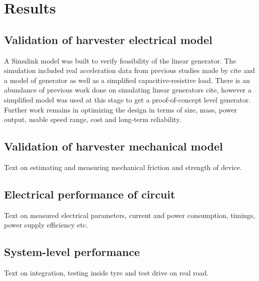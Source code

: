 \section{Results}

\subsection{Validation of harvester electrical model}
A Simulink model was built to verify feasibility of the linear generator. The simulation included real acceleration data from previous studies made by {\color{red} cite} and a model of generator as well as a simplified capacitive-resistive load. There is an abundance of previous work done on simulating linear generators  {\color{red} cite}, however a simplified model was used at this stage to get a proof-of-concept level generator. Further work remains in optimizing the design in terms of size, mass, power output, usable speed range, cost and long-term reliability.

\subsection{Validation of harvester mechanical model}
Text on estimating and measuring mechanical friction and strength of device.

\subsection{Electrical performance of circuit}
Text on measured electrical parameters, current and power consumption, timings, power supply efficiency etc.

\subsection{System-level performance}
Text on integration, testing inside tyre and test drive on real road.

